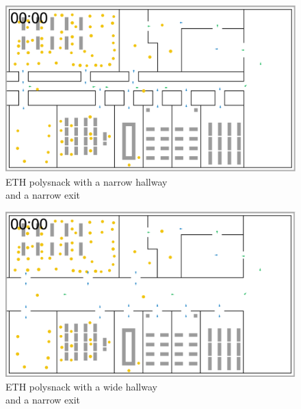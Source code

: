 \documentclass[11pt]{article}
\begin{document}
\begin{minipage}{.5\textwidth}
\begin{figure}[H]
		\centering
		\includegraphics[width=.9\linewidth]{assets/polysnack-experimental}\\
		ETH polysnack with a narrow hallway\\
		and a narrow exit
	\end{figure}
\end{minipage}
\begin{minipage}{.5\textwidth}
	\begin{figure}[H]
	\centering
	\includegraphics[width=.9\linewidth]{assets/polysnack-experimental-2}\\
	ETH polysnack with a wide hallway\\
	and a narrow exit
\end{figure}
\end{minipage}
\end{document}
